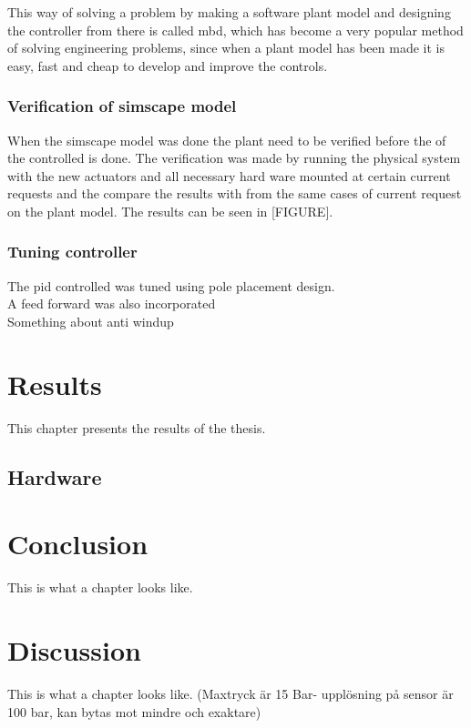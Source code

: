 \documentclass[a4paper,11pt]{kth-mag}
\begin{document}
This way of solving a problem by making a software plant model and designing the controller from there is called \gls{mbd}, which has become a very popular method of solving engineering problems, since when a plant model has been made it is easy, fast and cheap to develop and improve the controls\cite{2010-01-1999}. 

\subsection{Verification of simscape model}
When the simscape model was done the plant need to be verified before the of the controlled is done. The verification was made by running the physical system with the new actuators and all necessary hard ware mounted at certain current requests and the compare the results with from the same cases of current request on the plant model. The results can be seen in [FIGURE]. 

\subsection{Tuning controller}
The \gls{pid} controlled was tuned using pole placement design. \\

A feed forward was also incorporated\\

Something about anti windup\\



\chapter{Results}
This chapter presents the results of the thesis.
\section{Hardware}





\chapter{Conclusion}
This is what a chapter looks like.

\chapter{Discussion}
This is what a chapter looks like.
(Maxtryck är 15 Bar- upplösning på sensor är 100 bar, kan bytas mot mindre och exaktare)
\end{document}
